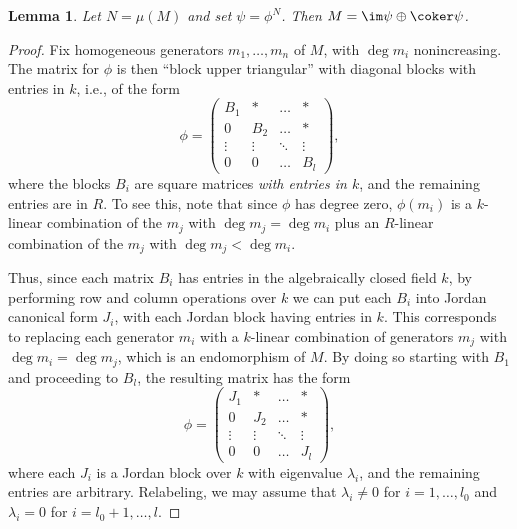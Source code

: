 \documentclass[12pt]{article}
\let\b\beta
\let\l\lambda
\def\ZZ{\mathbb Z}
\theoremstyle{theorem}
\numberwithin{thm}{section}
\newtheorem{lem}[thm]{Lemma}
\theoremstyle{definition}
\begin{document}

\begin{lem}\label{graded_algorithm}
  Let $N = \mu(M)$ and set $\psi = \phi^N$. Then $M = \im\psi \oplus \coker\psi$.
\end{lem}
\begin{proof}
  Fix homogeneous generators $m_1,\dots, m_n$ of $M$, with $\deg m_i$ nonincreasing.
  The matrix for $\phi$ is then ``block upper triangular'' with diagonal blocks with entries in $k$, i.e., of the form
  \[ \phi = \begin{pmatrix}
    B_1    & *      & \dots  & *      \\
    0      & B_2    & \dots  & *      \\
    \vdots & \vdots & \ddots & \vdots \\
    0      & 0      & \dots  & B_l
  \end{pmatrix}, \]
  where the blocks $B_i$ are square matrices \emph{with entries in $k$}, and the remaining entries are in $R$. To see this, note that since $\phi$ has degree zero, $\phi(m_i)$ is a $k$-linear combination of the $m_j$ with $\deg m_j = \deg m_i$ plus an $R$-linear combination of the $m_j$ with $\deg m_j < \deg m_i$.

  Thus, since each matrix $B_i$ has entries in the algebraically closed field $k$, by performing row and column operations over $k$ we can put each $B_i$ into Jordan canonical form $J_i$, with each Jordan block having entries in $k$. This corresponds to replacing each generator $m_i$ with a $k$-linear combination of generators $m_j$ with $\deg m_i = \deg m_j$, which is an endomorphism of $M$. By doing so starting with $B_1$ and proceeding to $B_l$, the resulting matrix has the form
  \begin{equation}
    \label{eq:Jordan}
    \phi
    =
    \begin{pmatrix}
      J_1    & *      & \dots  & *      \\
      0      & J_2    & \dots  & *      \\
      \vdots & \vdots & \ddots & \vdots \\
      0      & 0      & \dots  & J_l
    \end{pmatrix},
  \end{equation}
  where each $J_i$ is a Jordan block over $k$ with eigenvalue $\l_i$, and the remaining entries are arbitrary.
  Relabeling, we may assume that $\l_i\neq 0$ for $i=1,\dots,l_0$ and $\l_i=0$ for $i=l_0+1,\dots,l$.


\end{proof}
\end{document}
